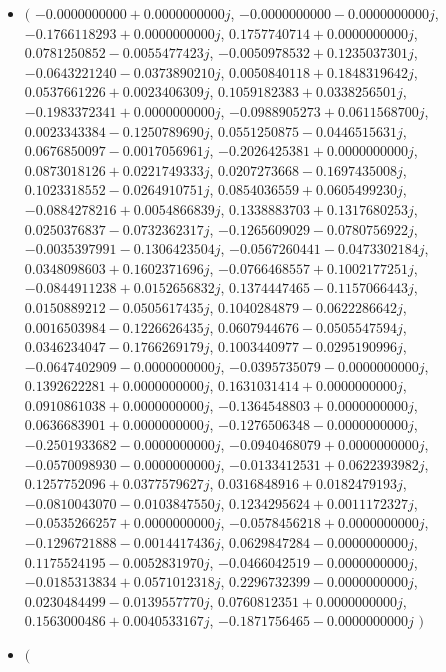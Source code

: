 \documentclass[14pt,a4paper]{article}
\begin{document}
\begin{itemize}
\item
$\big($
$-0.0000000000+0.0000000000j$, $-0.0000000000-0.0000000000j$, $-0.1766118293+0.0000000000j$, $0.1757740714+0.0000000000j$, $0.0781250852-0.0055477423j$, $-0.0050978532+0.1235037301j$, $-0.0643221240-0.0373890210j$, $0.0050840118+0.1848319642j$, $0.0537661226+0.0023406309j$, $0.1059182383+0.0338256501j$, $-0.1983372341+0.0000000000j$, $-0.0988905273+0.0611568700j$, $0.0023343384-0.1250789690j$, $0.0551250875-0.0446515631j$, $0.0676850097-0.0017056961j$, $-0.2026425381+0.0000000000j$, $0.0873018126+0.0221749333j$, $0.0207273668-0.1697435008j$, $0.1023318552-0.0264910751j$, $0.0854036559+0.0605499230j$, $-0.0884278216+0.0054866839j$, $0.1338883703+0.1317680253j$, $0.0250376837-0.0732362317j$, $-0.1265609029-0.0780756922j$, $-0.0035397991-0.1306423504j$, $-0.0567260441-0.0473302184j$, $0.0348098603+0.1602371696j$, $-0.0766468557+0.1002177251j$, $-0.0844911238+0.0152656832j$, $0.1374447465-0.1157066443j$, $0.0150889212-0.0505617435j$, $0.1040284879-0.0622286642j$, $0.0016503984-0.1226626435j$, $0.0607944676-0.0505547594j$, $0.0346234047-0.1766269179j$, $0.1003440977-0.0295190996j$, $-0.0647402909-0.0000000000j$, $-0.0395735079-0.0000000000j$, $0.1392622281+0.0000000000j$, $0.1631031414+0.0000000000j$, $0.0910861038+0.0000000000j$, $-0.1364548803+0.0000000000j$, $0.0636683901+0.0000000000j$, $-0.1276506348-0.0000000000j$, $-0.2501933682-0.0000000000j$, $-0.0940468079+0.0000000000j$, $-0.0570098930-0.0000000000j$, $-0.0133412531+0.0622393982j$, $0.1257752096+0.0377579627j$, $0.0316848916+0.0182479193j$, $-0.0810043070-0.0103847550j$, $0.1234295624+0.0011172327j$, $-0.0535266257+0.0000000000j$, $-0.0578456218+0.0000000000j$, $-0.1296721888-0.0014417436j$, $0.0629847284-0.0000000000j$, $0.1175524195-0.0052831970j$, $-0.0466042519-0.0000000000j$, $-0.0185313834+0.0571012318j$, $0.2296732399-0.0000000000j$, $0.0230484499-0.0139557770j$, $0.0760812351+0.0000000000j$, $0.1563000486+0.0040533167j$, $-0.1871756465-0.0000000000j$
$\big)$
\item
$\big($

\end{itemize}
\end{document}

